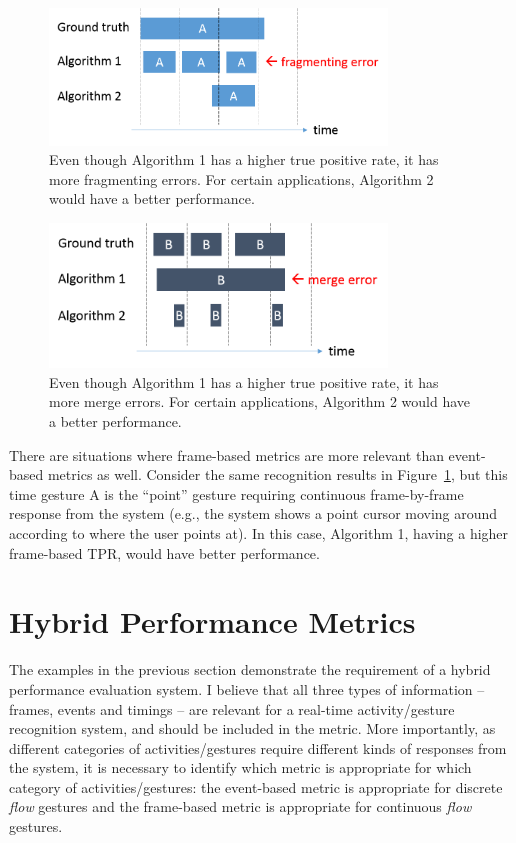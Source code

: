 \begin{figure}[tbh]
\centering
\includegraphics[width=0.8\textwidth]{figures/fragment.png}
\caption{Even though Algorithm 1 has a higher true positive rate, it has more
fragmenting errors. For certain applications, Algorithm 2 would have a better
performance.}
\label{fig:fragment}
\end{figure}

\begin{figure}[tbh]
\centering
\includegraphics[width=0.8\textwidth]{figures/merge.png}
\caption{Even though Algorithm 1 has a higher true positive rate, it has more
merge errors. For certain applications, Algorithm 2 would have a better
performance.}
\label{fig:merge}
\end{figure}

There are situations where frame-based metrics are more relevant than
event-based metrics as well. Consider the same recognition results in
Figure~\ref{fig:fragment}, but this time gesture A is the ``point'' gesture
requiring continuous frame-by-frame response from the system (e.g., the system
shows a point cursor moving around according to where the user points at). In this case,
Algorithm 1, having a higher frame-based TPR, would have
better performance.

\section{Hybrid Performance Metrics}\label{sec:metrics} 
The examples in the previous section demonstrate the requirement of a hybrid
performance evaluation system. I believe that all three types of information -- frames, events and
timings -- are relevant for a real-time activity/gesture recognition system,
and should be included in the metric.
More importantly, as different categories of activities/gestures require
different kinds of responses from the system, it is necessary to identify
which metric is appropriate for which category of activities/gestures:  the event-based metric is
appropriate for discrete \textit{flow} gestures and the frame-based metric is
appropriate for continuous \textit{flow} gestures.

